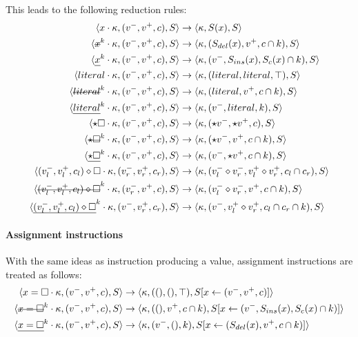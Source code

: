 \documentclass[a4paper,11pt]{article}
\newcommand\mathst[1]{\text{\st{$#1$}}}
\newcommand\mathul[1]{\text{\ul{$#1$}}}
\newcommand\rtstate[3]{\langle #1, #2, #3\rangle}
\begin{document}
This leads to the following reduction rules:
\begin{align*}
\rtstate{x \cdot \kappa}{(v^-, v^+, c)}{S} &\rightarrow \rtstate{\kappa}{S(x)}{S}\\
\rtstate{\mathst{x}^k \cdot \kappa}{(v^-, v^+, c)}{S} &\rightarrow \rtstate{\kappa}{(S_{del}(x), v^+, c \cap k)}{S}\\
\rtstate{\mathul{x}^k \cdot \kappa}{(v^-, v^+, c)}{S} &\rightarrow \rtstate{\kappa}{(v^-, S_{ins}(x), S_c(x) \cap k)}{S}\\
\rtstate{literal \cdot \kappa}{(v^-, v^+, c)}{S} &\rightarrow \rtstate{\kappa}{(literal, literal, \top)}{S}\\
\rtstate{\mathst{literal}^k \cdot \kappa}{(v^-, v^+, c)}{S} &\rightarrow \rtstate{\kappa}{(literal, v^+, c \cap k)}{S}\\
\rtstate{\mathul{literal}^k \cdot \kappa}{(v^-, v^+, c)}{S} &\rightarrow \rtstate{\kappa}{(v^-, literal, k)}{S}\\
\rtstate{\star \square \cdot \kappa}{(v^-, v^+, c)}{S} &\rightarrow \rtstate{\kappa}{(\star v^-, \star v^+, c)}{S}\\
\rtstate{\mathst{\star \square}^k \cdot \kappa}{(v^-, v^+, c)}{S} &\rightarrow \rtstate{\kappa}{(\star v^-, v^+, c \cap k)}{S}\\
\rtstate{\mathul{\star \square}^k \cdot \kappa}{(v^-, v^+, c)}{S} &\rightarrow \rtstate{\kappa}{(v^-, \star v^+, c \cap k)}{S}\\
\rtstate{(v_l^-, v_l^+, c_l) \diamond \square \cdot \kappa}{(v_r^-, v_r^+, c_r)}{S} &\rightarrow \rtstate{\kappa}{(v_l^- \diamond v_r^-, v_l^+ \diamond v_r^+, c_l \cap c_r)}{S}\\
\rtstate{\mathst{(v_l^-, v_l^+, c_l) \diamond \square}^k \cdot \kappa}{(v_r^-, v^+, c)}{S} &\rightarrow \rtstate{\kappa}{(v_l^- \diamond v_r^-, v^+, c \cap k)}{S}\\
\rtstate{\mathul{(v_l^-, v_l^+, c_l) \diamond \square}^k \cdot \kappa}{(v^-, v_r^+, c_r)}{S} &\rightarrow \rtstate{\kappa}{(v^-, v_l^+ \diamond v_r^+, c_l \cap c_r \cap k)}{S}\\
\end{align*}

\paragraph{Assignment instructions}
With the same ideas as instruction producing a value, assignment instructions are treated as follows:
\begin{align*}
\rtstate{x = \square \cdot \kappa}{(v^-, v^+, c)}{S} &\rightarrow \rtstate{\kappa}{((), (), \top)}{S[x \leftarrow (v^-, v^+, c)]}\\
\rtstate{\mathst{x = \square}^k \cdot \kappa}{(v^-, v^+, c)}{S} &\rightarrow \rtstate{\kappa}{((), v^+, c \cap k)}{S[x \leftarrow (v^-, S_{ins}(x), S_c(x) \cap k)]}\\
\rtstate{\mathul{x = \square}^k \cdot \kappa}{(v^-, v^+, c)}{S} &\rightarrow \rtstate{\kappa}{(v^-, (), k)}{S[x \leftarrow (S_{del}(x), v^+, c \cap k)]}\\
\end{align*}
\end{document}
